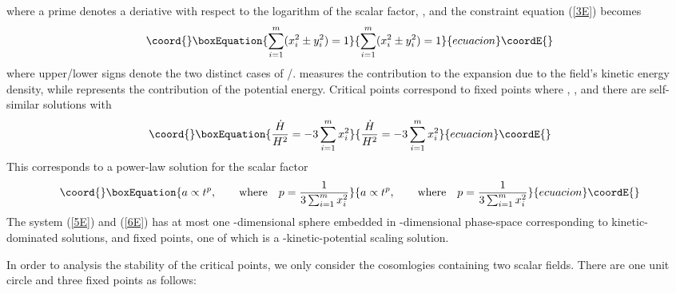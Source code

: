 \documentclass[a4paper,12pt]{article}
\begin{document}
where a prime denotes a deriative with respect to the logarithm of
the scalar factor, \coordHE{}, and the constraint equation
(\ref{3E}) becomes
\begin{equation}\coord{}\boxEquation{
\sum_{i=1}^{m}(x_i^2\pm y_i^2)=1
}{
\sum_{i=1}^{m}(x_i^2\pm y_i^2)=1
}{ecuacion}\coordE{}\end{equation}
where upper/lower signs denote the two distinct cases of \coordHE{}/\coordHE{}.
\coordHE{} measures the contribution to the expansion due to the field's
kinetic energy density, while \coordHE{} represents the contribution
of the potential energy.
Critical points correspond to fixed points where \coordHE{},
\coordHE{}, and there are self-similar solutions with
\begin{equation}\coord{}\boxEquation{
\frac{\dot{H}}{H^2}=-3\sum_{i=1}^{m}x_i^2
}{
\frac{\dot{H}}{H^2}=-3\sum_{i=1}^{m}x_i^2
}{ecuacion}\coordE{}\end{equation}
This corresponds to a power-law solution for the scalar factor
\begin{equation}\coord{}\boxEquation{
a\propto t^p, \qquad \textrm{where} \quad
p=\frac{1}{3\sum_{i=1}^{m}x_i^2}
}{
a\propto t^p, \qquad \textrm{where} \quad
p=\frac{1}{3\sum_{i=1}^{m}x_i^2}
}{ecuacion}\coordE{}\end{equation}
The system (\ref{5E}) and (\ref{6E}) has at most one \coordHE{}-dimensional
sphere embedded in \coordHE{}-dimensional phase-space corresponding to
kinetic-dominated solutions, and \coordHE{} fixed points, one of
which is a \coordHE{}-kinetic-potential scaling solution.

In order to analysis the stability of the critical points, we only
consider the cosomlogies containing two scalar fields. There are
one unit circle and three fixed points as follows:
\end{document}

